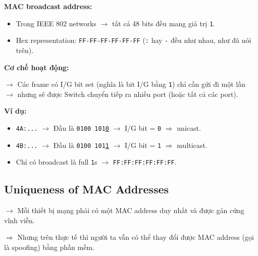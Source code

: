 \noindent
\textbf{MAC broadcast address:}

\begin{itemize}
    \item Trong IEEE 802 networks $\rightarrow$ tất cả 48 bits đều mang giá trị \texttt{1}.
    \item Hex representation: \texttt{FF-FF-FF-FF-FF-FF} (\texttt{:} hay \texttt{-} đều như nhau, như đã nói trên).
\end{itemize}
\medskip

\noindent
\textbf{Cơ chế hoạt động:}
\medskip

\noindent
$\rightarrow$ Các frame có I/G bit set (nghĩa là bit I/G bằng \texttt{1}) chỉ cần gửi đi một lần $\rightarrow$ nhưng sẽ được Switch chuyển tiếp ra nhiều port (hoặc tất cả các port).
\medskip


\noindent
\textbf{Ví dụ:}

\begin{itemize}
    \item \texttt{4A:...} $\rightarrow$ Đầu là \texttt{0100 101\underline{0}} $\rightarrow$ I/G bit = \texttt{0} $\Rightarrow$ unicast.
    \item \texttt{4B:...} $\rightarrow$ Đầu là \texttt{0100 101\underline{1}} $\rightarrow$ I/G bit = \texttt{1} $\Rightarrow$ multicast.
    \item[$\Rightarrow$] Chỉ có broadcast là full \texttt{1}s $\rightarrow$ \texttt{FF:FF:FF:FF:FF:FF}.
\end{itemize}
\medskip

\subsection{Uniqueness of MAC Addresses}

\noindent
$\rightarrow$ Mỗi thiết bị mạng phải có một MAC address duy nhất và được gán cứng vĩnh viễn.

$\Rightarrow$ Nhưng trên thực tế thì người ta vẫn có thể thay đổi được MAC address (gọi là spoofing) bằng phần mềm.
\medskip

